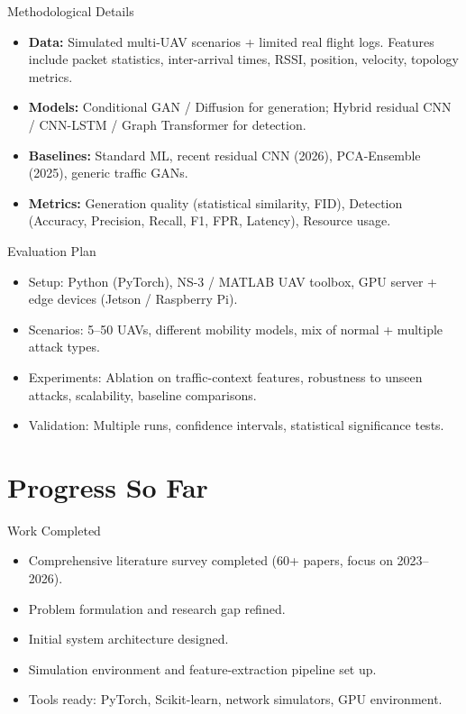 \documentclass[10pt]{beamer}
\begin{document}
\begin{frame}{Methodological Details}
    \begin{itemize}
        \item \textbf{Data:} Simulated multi-UAV scenarios + limited real flight logs. Features include packet statistics, inter-arrival times, RSSI, position, velocity, topology metrics.
        \item \textbf{Models:} Conditional GAN / Diffusion for generation; Hybrid residual CNN / CNN-LSTM / Graph Transformer for detection.
        \item \textbf{Baselines:} Standard ML, recent residual CNN (2026), PCA-Ensemble (2025), generic traffic GANs.
        \item \textbf{Metrics:} Generation quality (statistical similarity, FID), Detection (Accuracy, Precision, Recall, F1, FPR, Latency), Resource usage.
    \end{itemize}
\end{frame}

\begin{frame}{Evaluation Plan}
    \begin{itemize}
        \item Setup: Python (PyTorch), NS-3 / MATLAB UAV toolbox, GPU server + edge devices (Jetson / Raspberry Pi).
        \item Scenarios: 5–50 UAVs, different mobility models, mix of normal + multiple attack types.
        \item Experiments: Ablation on traffic-context features, robustness to unseen attacks, scalability, baseline comparisons.
        \item Validation: Multiple runs, confidence intervals, statistical significance tests.
    \end{itemize}
\end{frame}

\section{Progress So Far}
\begin{frame}{Work Completed}
    \begin{itemize}
        \item Comprehensive literature survey completed (60+ papers, focus on 2023–2026).
        \item Problem formulation and research gap refined.
        \item Initial system architecture designed.
        \item Simulation environment and feature-extraction pipeline set up.
        \item Tools ready: PyTorch, Scikit-learn, network simulators, GPU environment.
    \end{itemize}
\end{frame}
\end{document}
